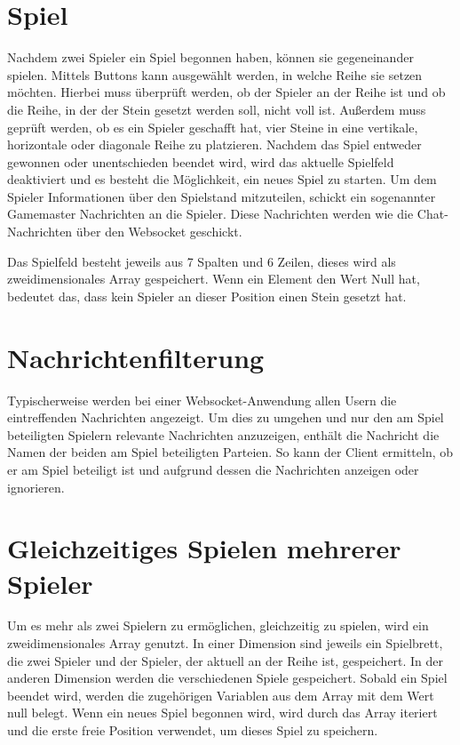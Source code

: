 \section{Spiel}\label{sec:Spiel}
Nachdem zwei Spieler ein Spiel begonnen haben, können sie gegeneinander spielen. Mittels Buttons kann ausgewählt werden, in welche Reihe sie setzen möchten. Hierbei muss überprüft werden, ob der Spieler an der Reihe ist und ob die Reihe, in der der Stein gesetzt werden soll, nicht voll ist. Außerdem muss geprüft werden, ob es ein Spieler geschafft hat, vier Steine in eine vertikale, horizontale oder diagonale Reihe zu platzieren. Nachdem das Spiel entweder gewonnen oder unentschieden beendet wird, wird das aktuelle Spielfeld deaktiviert und es besteht die Möglichkeit, ein neues Spiel zu starten. Um dem Spieler Informationen über den Spielstand mitzuteilen, schickt ein sogenannter Gamemaster Nachrichten an die Spieler.  Diese Nachrichten werden wie die Chat-Nachrichten über den Websocket geschickt.

Das Spielfeld besteht jeweils aus 7 Spalten und 6 Zeilen, dieses wird als zweidimensionales Array gespeichert. Wenn ein Element den Wert Null hat, bedeutet das, dass kein Spieler an dieser Position einen Stein gesetzt hat.
\section{Nachrichtenfilterung}\label{sec:Nachrichtenfilter}
Typischerweise werden bei einer Websocket-Anwendung allen Usern die eintreffenden Nachrichten angezeigt. Um dies zu umgehen und nur den am Spiel beteiligten Spielern relevante Nachrichten anzuzeigen, enthält die Nachricht die Namen der beiden am Spiel beteiligten Parteien. So kann der Client ermitteln, ob er am Spiel beteiligt ist und aufgrund dessen die Nachrichten anzeigen oder ignorieren. 

\section{Gleichzeitiges Spielen mehrerer Spieler}\label{sec:Multiplegames}
Um es mehr als zwei Spielern zu ermöglichen, gleichzeitig zu spielen, wird ein zweidimensionales Array genutzt. In einer Dimension sind jeweils ein Spielbrett, die zwei Spieler und der Spieler, der aktuell an der Reihe ist, gespeichert. In der anderen Dimension werden die verschiedenen Spiele gespeichert. Sobald ein Spiel beendet wird, werden die zugehörigen Variablen aus dem Array mit dem Wert null belegt. Wenn ein neues Spiel begonnen wird, wird durch das Array iteriert und die erste freie Position verwendet, um dieses Spiel zu speichern. 
